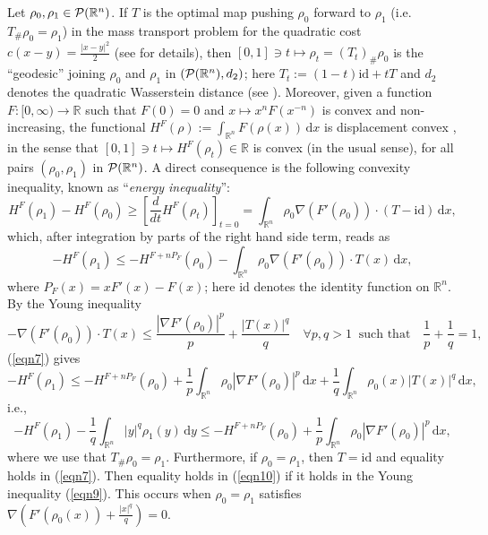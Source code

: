 \documentclass[10pt]{article}
\numberwithin{equation}{section}
\theoremstyle{plain}
\theoremstyle{definition}
\theoremstyle{remark}
\newcommand\R{{\mathbb R}}
\newcommand\dd{\,\mbox{d} }
\begin{document}
 Let $\rho_0, \rho_1\in {\cal P}(\R^n)$. If $T$ is the optimal map pushing $\rho_0$ forward to $\rho_1$ (i.e. $T_{\#}\rho_0=\rho_1$) in the mass transport problem for the quadratic cost $c(x-y)=\frac{|x-y|^2}{2}$ (see \cite{vi} for details), then $[0,1]\ni t\mapsto \rho_t=(T_t)_{\#}\rho_0$ is the ``geodesic'' joining $\rho_0$ and $\rho_1$ in $\left({\cal P}(\R^n), d_2\right)$; here $T_t:=(1-t)\mbox{id}+tT$ and $d_2$ denotes the quadratic Wasserstein distance (see \cite{vi}). Moreover, given a function $F:[0,\infty)\rightarrow \R$ such that $F(0)=0$ and $x\mapsto x^nF(x^{-n})$ is convex and non-increasing, the functional $H^F(\rho):=\int_{\R^n} F\left(\rho(x)\right)\dd x$ is displacement convex \cite{mc}, in the sense that $[0,1]\ni t\mapsto H^F(\rho_t)\in \R$ is convex (in the usual sense), for all pairs $(\rho_0,\rho_1)$ in ${\cal P}(\R^n)$. A direct consequence is the following convexity inequality, known as ``{\em energy inequality}'':
\[H^F(\rho_1)-H^F(\rho_0) \geq \left[\frac{d}{dt}H^F(\rho_t)\right]_{t=0} = \int_{\R^n} \rho_0\nabla\left(F'(\rho_0)\right)\cdot\left(T-\mbox{id}\right)\dd x,\]
which, after integration by parts of the right hand side term, reads as
\begin{equation}\label{eqn7}
-H^F(\rho_1) \leq - H^{F+nP_F}(\rho_0)  -\int_{\R^n}\rho_0\nabla\left(F'(\rho_0)\right)\cdot T(x)\,\mbox{d}x,
\end{equation}
where $P_F(x)=xF'(x)-F(x)$; here $\mbox{id}$ denotes the identity function on $\R^n$. By the Young inequality
\begin{equation}\label{eqn9}
-\nabla\left(F'(\rho_0)\right)\cdot T(x)\leq  \frac{|\nabla F'(\rho_0)|^p}{p} + \frac{|T(x)|^{q}}{q}  \quad \forall p, q >1 \;\; \mbox{such that} \quad \frac{1}{p}+\frac{1}{q}=1,
\end{equation}
(\ref{eqn7}) gives
\[-H^F(\rho_1)\leq -H^{F+nP_F}(\rho_0)+\frac{1}{p}\int_{\R^n}\rho_0 |\nabla F'(\rho_0)|^p \,\mbox{d}x + \frac{1}{q}\int_{\R^n}\rho_0(x) |T(x)|^{q}\,\mbox{d}x,\]
i.e.,
 \begin{equation}\label{eqn10}
 -H^F(\rho_1) - \frac{1}{q}\int_{\R^n} |y|^q\rho_1(y)\dd y  \leq -H^{F+nP_F}(\rho_0) + \frac{1}{p}\int_{\R^n}\rho_0 |\nabla F'(\rho_0)|^{p} \,\mbox{d}x,
 \end{equation}
 where we use that $T_{\#}\rho_0=\rho_1$.  Furthermore, if $\rho_0=\rho_1$, then $T=\mbox{id}$ and equality holds in (\ref{eqn7}). Then equality holds in (\ref{eqn10}) if it holds in the Young inequality (\ref{eqn9}). This occurs when $\rho_0=\rho_1$ satisfies 
 $\nabla\left(F'\left(\rho_0(x)\right)+\frac{|x|^{q}}{q}\right)=0$.
\end{document}
